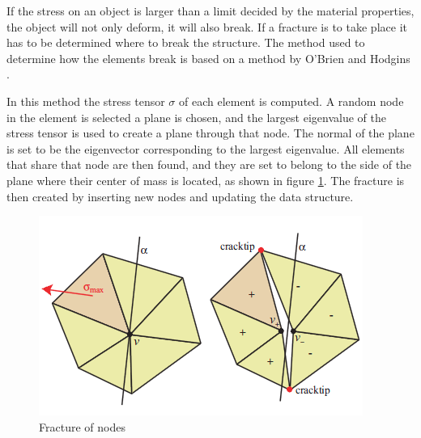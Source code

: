 If the stress on an object is larger than a limit decided by the material properties, the object will not only deform, it will also break. If a fracture is to take place it has to be determined where to break the structure. The method used to determine how the elements break is based on a method by O'Brien and Hodgins \cite{fracture} .

In this method the stress tensor $\sigma$ of each element is computed. A random node in the element is selected a plane is chosen, and the largest eigenvalue of the stress tensor is used to create a plane through that node. The normal of the plane is set to be the eigenvector corresponding to the largest eigenvalue. All elements that share that node are then found, and they are set to belong to the side of the plane where their center of mass is located, as shown in figure \ref{fig:fracture}. The fracture is then created by inserting new nodes and updating the data structure.

\begin{figure}[htbp]
\label{fig:fracture}
\begin{center}
\includegraphics[scale = 0.3]{figures/fracture.png}
\caption{Fracture of nodes}
\end{center}
\end{figure}